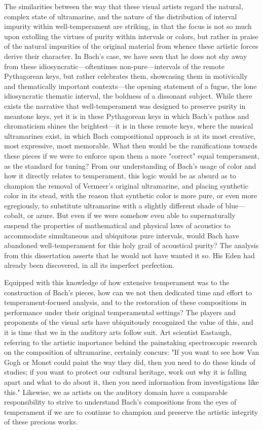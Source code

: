The similarities between the way that these visual artists regard the
natural, complex state of ultramarine, and the nature of the
distribution of interval impurity within well-temperament are striking,
in that the focus is not so much upon extolling the virtues of purity
within intervals or colors, but rather in praise of the natural
impurities of the original material from whence these artistic forces
derive their character. In Bach's case, we have seen that he does not
shy away from these idiosyncratic---oftentimes
non-pure---intervals of the remote Pythagorean keys, but rather
celebrates them, showcasing them in motivically and thematically
important contexts---the opening statement of a fugue, the lone
idiosyncratic thematic interval, the boldness of a dissonant subject.
While there exists the narrative that well-temperament was designed to
preserve purity in meantone keys, yet it is in these Pythagorean keys in
which Bach's pathos and chromaticism shines the brightest---it is in
these remote keys, where the musical ultramarines exist, in which Bach
compositional approach is at its most creative, most expressive, most
memorable. What then would be the ramifications towards these pieces if
we were to enforce upon them a more "correct" equal temperament, as the
standard for tuning? From our understanding of Bach's usage of color and
how it directly relates to temperament, this logic would be as absurd as
to champion the removal of Vermeer's original ultramarine, and placing
synthetic color in its stead, with the reason that synthetic color is
more pure, or even more egregiously, to substitute ultramarine with a
slightly different shade of blue---cobalt, or azure. But even if we
were somehow even able to supernaturally suspend the properties of
mathematical and physical laws of acoustics to accommodate simultaneous
and ubiquitous pure intervals, would Bach have abandoned
well-temperament for this holy grail of acoustical purity? The analysis
from this dissertation asserts that he would not have wanted it so. His
Eden had already been discovered, in all its imperfect perfection.

Equipped with this knowledge of how extensive temperament was to the
construction of Bach's pieces, how can we not then dedicated time and
effort to temperament-focused analysis, and to the restoration of these
compositions in performance under their original temperamental settings?
The players and proponents of the visual arts have ubiquitously
recognized the value of this, and it is time that we in the auditory
arts follow suit. Art scientist Eastaugh, referring to the artistic
importance behind the painstaking spectroscopic research on the
composition of ultramarine, certainly concurs: "If you want to see how
Van Gogh or Monet could paint the way they did, then you need to do
these kinds of studies; if you want to protect our cultural heritage,
work out why it is falling apart and what to do about it, then you need
information from investigations like this." Likewise, we as artists on
the auditory domain have a comparable responsibility to strive to
understand Bach's compositions from the eyes of temperament if we are to
continue to champion and preserve the artistic integrity of these
precious works.

